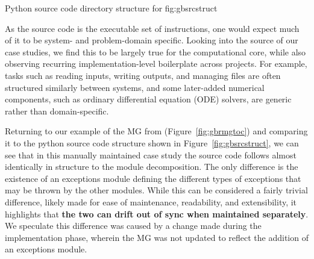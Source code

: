 {Python source code directory structure for \gb{}}
{fig:gbsrcstruct}

As the source code is the executable set of instructions, one would expect much 
of it to be system- and problem-domain specific. Looking into the source of our 
case studies, we find this to be largely true for the computational core, while 
also observing recurring implementation-level boilerplate across projects. For 
example, tasks such as reading inputs, writing outputs, and managing files are 
often structured similarly between systems, and some later-added
numerical components, such as ordinary differential equation (ODE) solvers, are
generic rather than domain-specific.

Returning to our example of the MG from \gb{} (Figure~\ref{fig:gbrmgtoc}) and 
comparing it to the python source code structure shown in 
Figure~\ref{fig:gbsrcstruct}, we can see that in this manually maintained case 
study the source code follows almost identically in structure to the module 
decomposition. The only difference is the existence of an exceptions module 
defining the different types of exceptions that may be thrown by the other 
modules. While this can be considered a fairly trivial difference, likely made 
for ease of maintenance, readability, and extensibility, it highlights that 
\textbf{the two \sfs{} can drift out of sync when maintained separately}. We 
speculate this difference was caused by a change made during the implementation 
phase, wherein the MG was not updated to reflect the addition of an exceptions 
module.

